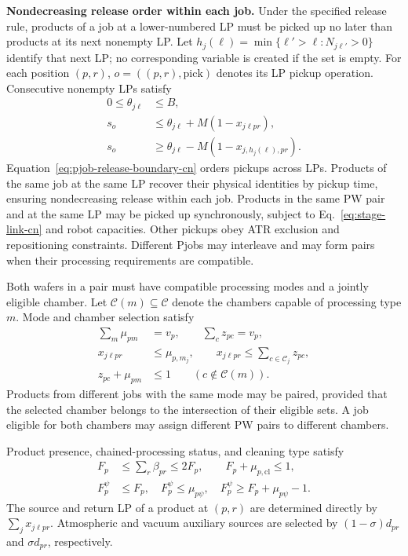 \documentclass[final,5p,times,twocolumn]{elsarticle}
\begin{document}
\noindent\textbf{Nondecreasing release order within each job.}
Under the specified release rule, products of a job at a lower-numbered LP must be picked up no later than products at its next nonempty LP. Let $h_j(\ell)=\min\{\ell'>\ell:N_{j\ell'}>0\}$ identify that next LP; no corresponding variable is created if the set is empty. For each position $(p,r)$, $o=((p,r),\mathrm{pick})$ denotes its LP pickup operation. Consecutive nonempty LPs satisfy
\begin{equation}
\begin{aligned}
0\le\theta_{j\ell}&\le B,\\
s_o&\le\theta_{j\ell}+M(1-x_{j\ell pr}),\\
s_o&\ge\theta_{j\ell}-M(1-x_{j,h_j(\ell),pr}).
\end{aligned}
\label{eq:pjob-release-boundary-cn}
\end{equation}
Equation~\eqref{eq:pjob-release-boundary-cn} orders pickups across LPs. Products of the same job at the same LP recover their physical identities by pickup time, ensuring nondecreasing release within each job. Products in the same PW pair and at the same LP may be picked up synchronously, subject to Eq.~\eqref{eq:stage-link-cn} and robot capacities. Other pickups obey ATR exclusion and repositioning constraints. Different Pjobs may interleave and may form pairs when their processing requirements are compatible.

Both wafers in a pair must have compatible processing modes and a jointly eligible chamber. Let $\mathcal C(m)\subseteq\mathcal C$ denote the chambers capable of processing type $m$. Mode and chamber selection satisfy
\begin{equation}
\begin{aligned}
\sum_m\mu_{pm}&=v_p,\qquad \sum_c z_{pc}=v_p,\\
x_{j\ell pr}&\le\mu_{p,m_j},\qquad
x_{j\ell pr}\le\sum_{c\in\mathcal C_j}z_{pc},\\
z_{pc}+\mu_{pm}&\le1\qquad(c\notin\mathcal C(m)).
\end{aligned}
\label{eq:joint-chamber-cn}
\end{equation}
Products from different jobs with the same mode may be paired, provided that the selected chamber belongs to the intersection of their eligible sets. A job eligible for both chambers may assign different PW pairs to different chambers.

Product presence, chained-processing status, and cleaning type satisfy
\begin{equation}
\begin{aligned}
F_p&\le\sum_r\beta_{pr}\le2F_p,\qquad F_p+\mu_{p,\mathrm{cl}}\le1,\\
F_p^\psi&\le F_p,\quad F_p^\psi\le\mu_{p\psi},\quad
F_p^\psi\ge F_p+\mu_{p\psi}-1.
\end{aligned}
\label{eq:pair-type-cn}
\end{equation}
The source and return LP of a product at $(p,r)$ are determined directly by $\sum_jx_{j\ell pr}$. Atmospheric and vacuum auxiliary sources are selected by $(1-\sigma)d_{pr}$ and $\sigma d_{pr}$, respectively.
\end{document}
